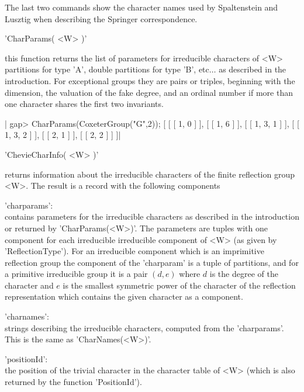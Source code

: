 The  last two  commands show  the character  names used by Spaltenstein and
Lusztig when describing the Springer correspondence.


'CharParams( <W> )'

this  function returns the list of parameters for irreducible characters of
<W>\:  partitions for type 'A', double partitions for type 'B', etc$\ldots$
as  described in the introduction. For exceptional groups they are pairs or
triples,  beginning with the  dimension, the valuation  of the fake degree,
and  an ordinal  number if  more than  one character  shares the  first two
invariants.

|    gap> CharParams(CoxeterGroup("G",2));
    [ [ [ 1, 0 ] ], [ [ 1, 6 ] ], [ [ 1, 3, 1 ] ], [ [ 1, 3, 2 ] ],
      [ [ 2, 1 ] ], [ [ 2, 2 ] ] ]|


'ChevieCharInfo( <W> )'

returns  information  about the  irreducible  characters  of the  finite
reflection group <W>.  The result is a record with the following
components\:\

'charparams':\\ contains parameters for the irreducible characters as
     described  in the  introduction or  returned by 'CharParams(<W>)'. The
     parameters   are  tuples  with  one  component  for  each  irreducible
     irreducible  component of <W>  (as given by  'ReflectionType'). For an
     irreducible  component which  is an  imprimitive reflection  group the
     component  of  the  'charparam'  is  a  tuple of partitions, and for a
     primitive  irreducible group  it is  a pair  $(d,e)$ where  $d$ is the
     degree of the character and $e$ is the smallest symmetric power of the
     character  of the  reflection representation  which contains the given
     character as a component.

'charnames':\\ strings describing the irreducible characters, computed from
     the 'charparams'. This is the same as 'CharNames(<W>)'.

'positionId':\\ the  position of the  trivial character  in the  character
     table  of <W>  (which is  also returned by the function 'PositionId').

